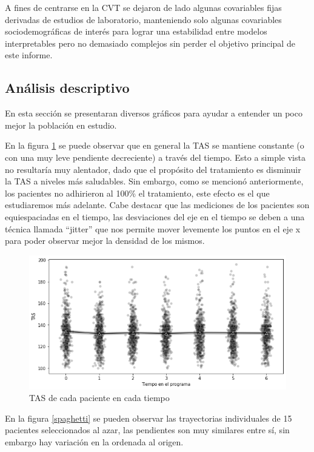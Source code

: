 \documentclass[spanish]{article}
\numberwithin{figure}{subsection}
\numberwithin{equation}{subsection}
\numberwithin{table}{subsection}
\begin{document}
A fines de centrarse en la CVT se dejaron de lado algunas covariables fijas
derivadas de estudios de laboratorio, manteniendo solo algunas covariables
sociodemográficas de interés para lograr una estabilidad entre modelos
interpretables pero no demasiado complejos sin perder el objetivo principal de
este informe.

\subsection{Análisis descriptivo}

En esta sección se presentaran diversos gráficos para ayudar a entender un poco
mejor la población en estudio.

En la figura \ref{TAS_vs_tpo} se puede observar que en general la TAS se
mantiene constante (o con una muy leve pendiente decreciente) a través del
tiempo. Esto a simple vista no resultaría muy alentador, dado que el propósito
del tratamiento es disminuir la TAS a niveles más saludables. Sin embargo, como
se mencionó anteriormente, los pacientes no adhirieron al 100\% el tratamiento,
este efecto es el que estudiaremos más adelante. Cabe destacar que las
mediciones de los pacientes son equiespaciadas en el tiempo, las desviaciones
del eje en el tiempo se deben a una técnica llamada ``jitter'' que nos permite
mover levemente los puntos en el eje x para poder observar mejor la densidad de
los mismos. 

\begin{figure}[H]
	\centering
	\includegraphics[scale=0.5]{img/TAS_vs_tpo.png}
	\caption{TAS de cada paciente en cada tiempo}
	\label{TAS_vs_tpo}
\end{figure}

En la figura \ref{spaghetti} se pueden observar las trayectorias individuales
de 15 pacientes seleccionados al azar, las pendientes son muy similares entre
sí, sin embargo hay variación en la ordenada al origen.
\end{document}
